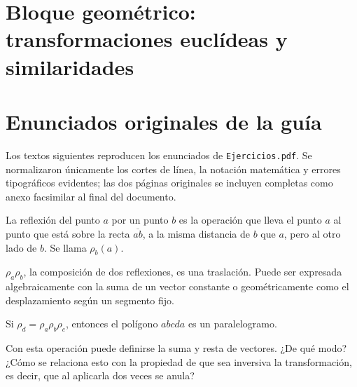 \section{Bloque geométrico: transformaciones euclídeas y similaridades}\label{cap:08}\label{sec:bloque-euclideas}

{\small\vspace{1mm}\par}


\section{Enunciados originales de la guía}

Los textos siguientes reproducen los enunciados de \texttt{Ejercicios.pdf}. Se normalizaron
únicamente los cortes de línea, la notación matemática y errores tipográficos evidentes; las
dos páginas originales se incluyen completas como anexo facsimilar al final del documento.

\begin{enunciado}[Definición 1]
La reflexión del punto \(a\) por un punto \(b\) es la operación que lleva el punto \(a\) al
punto que está sobre la recta \(\overline{ab}\), a la misma distancia de \(b\) que \(a\),
pero al otro lado de \(b\). Se llama \(\rho_b(a)\).
\end{enunciado}

\begin{enunciado}[Teorema 1]
\(\rho_a\rho_b\), la composición de dos reflexiones, es una traslación. Puede ser expresada
algebraicamente con la suma de un vector constante o geométricamente como el desplazamiento
según un segmento fijo.
\end{enunciado}

\begin{enunciado}[Teorema 2]
Si \(\rho_d=\rho_a\rho_b\rho_c\), entonces el polígono \(abcda\) es un paralelogramo.
\end{enunciado}

\begin{enunciado}[Observación]
Con esta operación puede definirse la suma y resta de vectores. ¿De qué modo? ¿Cómo se
relaciona esto con la propiedad de que sea inversiva la transformación, es decir, que al
aplicarla dos veces se anula?
\end{enunciado}

